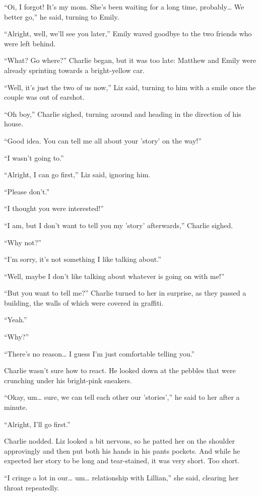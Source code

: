 “Oi, I forgot! It's my mom. She's been waiting for a long time, probably… We better go,” he said, turning to Emily.

“Alright, well, we'll see you later,” Emily waved goodbye to the two friends who were left behind.

“What? Go where?” Charlie began, but it was too late: Matthew and Emily were already sprinting towards a bright-yellow car.

“Well, it's just the two of us now,” Liz said, turning to him with a smile once the couple was out of earshot.

“Oh boy,” Charlie sighed, turning around and heading in the direction of his house.

“Good idea. You can tell me all about your 'story' on the way!”

“I wasn't going to.”

“Alright, I can go first,” Liz said, ignoring him.

“Please don't.”

“I thought you were interested!”

“I am, but I don't want to tell you my 'story' afterwards,” Charlie sighed.

“Why not?”

“I'm sorry, it's not something I like talking about.”

“Well, maybe I don't like talking about whatever is going on with me!”

“But you want to tell me?” Charlie turned to her in surprise, as they passed a building, the walls of which were covered in graffiti.

“Yeah.”

“Why?”

“There's no reason… I guess I'm just comfortable telling you.”

Charlie wasn't sure how to react. He looked down at the pebbles that were crunching under his bright-pink sneakers.

“Okay, um… sure, we can tell each other our 'stories',” he said to her after a minute.

“Alright, I'll go first.”

Charlie nodded. Liz looked a bit nervous, so he patted her on the shoulder approvingly and then put both his hands in his pants pockets. And while he expected her story to be long and tear-stained, it was very short. Too short.

“I cringe a lot in our… um… relationship with Lillian,” she said, clearing her throat repeatedly.

